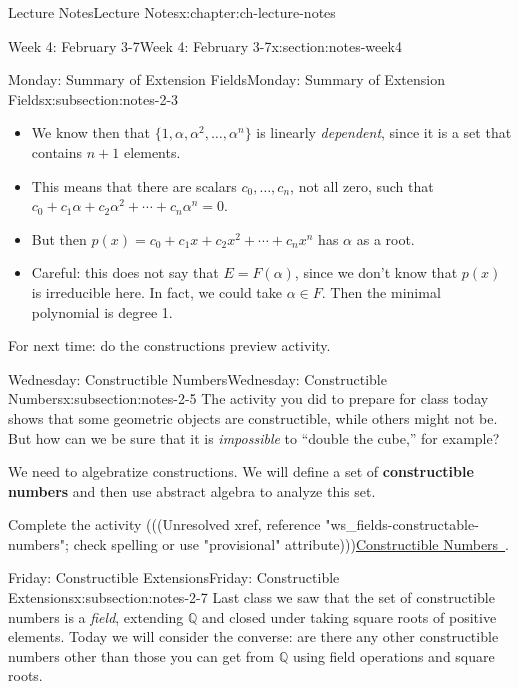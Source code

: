 \documentclass[oneside,11pt,]{book}
\newcommand{\terminology}[1]{\textbf{#1}}
\newcommand{\Q}{\mathbb{Q}}
\begin{document}
\begin{chapterptx}{Lecture Notes}{}{Lecture Notes}{}{}{x:chapter:ch-lecture-notes}
\begin{sectionptx}{Week 4: February 3-7}{}{Week 4: February 3-7}{}{}{x:section:notes-week4}
\begin{subsectionptx}{Monday: Summary of Extension Fields}{}{Monday: Summary of Extension Fields}{}{}{x:subsection:notes-2-3}
\begin{itemize}[label=\textbullet]
\item{}We know then that \(\{1, \alpha, \alpha^2, \ldots, \alpha^n\}\) is linearly \emph{dependent}, since it is a set that contains \(n+1\) elements.%
\item{}This means that there are scalars \(c_0, \ldots, c_n\), not all zero, such that \(c_0 + c_1\alpha + c_2 \alpha^2 + \cdots + c_n\alpha^n = 0\).%
\item{}But then \(p(x) = c_0 + c_1x + c_2x^2 + \cdots +c_nx^n\) has \(\alpha\) as a root.%
\item{}Careful: this does not say that \(E = F(\alpha)\), since we don't know that \(p(x)\) is irreducible here.  In fact, we could take \(\alpha \in F\).  Then the minimal polynomial is degree 1.%
\end{itemize}
%
\par
For next time: do the constructions preview activity.%
\end{subsectionptx}
%
%
\typeout{************************************************}
\typeout{************************************************}
%
\begin{subsectionptx}{Wednesday: Constructible Numbers}{}{Wednesday: Constructible Numbers}{}{}{x:subsection:notes-2-5}
The activity you did to prepare for class today shows that some geometric objects are constructible, while others might not be.  But how can we be sure that it is \emph{impossible} to ``double the cube,'' for example?%
\par
We need to algebratize constructions.  We will define a set of \terminology{constructible numbers} and then use abstract algebra to analyze this set.%
\par
Complete the activity {(((Unresolved xref, reference "ws\_fields-constructable-numbers"; check spelling or use "provisional" attribute)))}\hyperlink{}{Constructible Numbers~}.%
\end{subsectionptx}
%
%
\typeout{************************************************}
\typeout{************************************************}
%
\begin{subsectionptx}{Friday: Constructible Extensions}{}{Friday: Constructible Extensions}{}{}{x:subsection:notes-2-7}
Last class we saw that the set of constructible numbers is a \emph{field}, extending \(\Q\) and closed under taking square roots of positive elements. Today we will consider the converse: are there any other constructible numbers other than those you can get from \(\Q\) using field operations and square roots.%

\end{subsectionptx}
\end{sectionptx}
\end{chapterptx}
\end{document}
